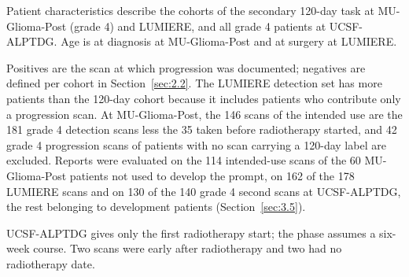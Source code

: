 \documentclass[largeformat]{interact} %
\begin{document}
\begin{table}[!htbp]
\begin{threeparttable}
\begin{tablenotes}
\item[a] Patient characteristics describe the cohorts of the secondary 120-day task at MU-Glioma-Post (grade 4)
and LUMIERE, and all grade 4 patients at UCSF-ALPTDG. Age is at diagnosis at MU-Glioma-Post and at surgery at
LUMIERE.
\item[b] Positives are the scan at which progression was documented; negatives are defined per cohort in
Section~\ref{sec:2.2}. The LUMIERE detection set has more patients than the 120-day cohort because it includes patients
who contribute only a progression scan. At MU-Glioma-Post, the 146 scans of the intended use are the 181 grade 4
detection scans less the 35 taken before radiotherapy started, and 42 grade 4 progression scans of patients with no
scan carrying a 120-day label are excluded. Reports were evaluated on the 114 intended-use scans of the
60 MU-Glioma-Post patients not used to develop the prompt, on 162 of the 178 LUMIERE scans and on 130 of the 140
grade 4 second scans at UCSF-ALPTDG, the rest belonging to development patients (Section~\ref{sec:3.5}).
\item[c] UCSF-ALPTDG gives only the first radiotherapy start; the phase assumes a six-week course. Two scans were
early after radiotherapy and two had no radiotherapy date.
\end{tablenotes}
\end{threeparttable}
\end{table}
\end{document}
